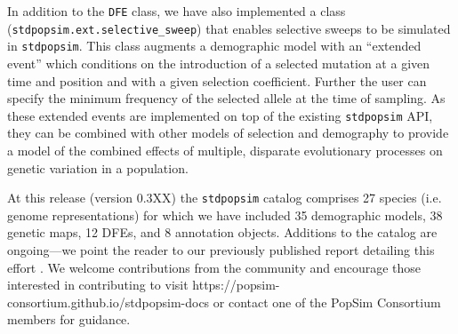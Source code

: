 \documentclass[hidelinks]{article}
\newcommand{\stdpopsim}{\texttt{stdpopsim}\xspace}
\begin{document}
    In addition to the \texttt{DFE} class, we have also implemented a class (\texttt{stdpopsim.ext.selective\_sweep})
    that enables selective sweeps to be simulated in \stdpopsim.
    This class augments a demographic model with an ``extended event''
    which conditions on the introduction of a selected mutation at a given time and position
    and with a given selection coefficient. Further the user can specify the minimum frequency
    of the selected allele at the time of sampling. As these extended events are implemented
    on top of the existing \stdpopsim API, they can be combined with other models of selection
    and demography to provide a model of the combined effects of multiple, disparate evolutionary processes
    on genetic variation in a population.
    

    At this release (version 0.3XX) the \stdpopsim catalog comprises 27 species (i.e. genome representations)
    for which we have included 35 demographic models, 38 genetic maps, 12 DFEs, and 8 annotation objects. %
    Additions to the catalog are ongoing---we point the reader to our previously published 
    report detailing this effort \citep{lauterbur2023expanding}. We welcome contributions from the
    community and encourage those interested in contributing to visit https://popsim-consortium.github.io/stdpopsim-docs
    or contact one of the PopSim Consortium members for guidance.


\end{document}
